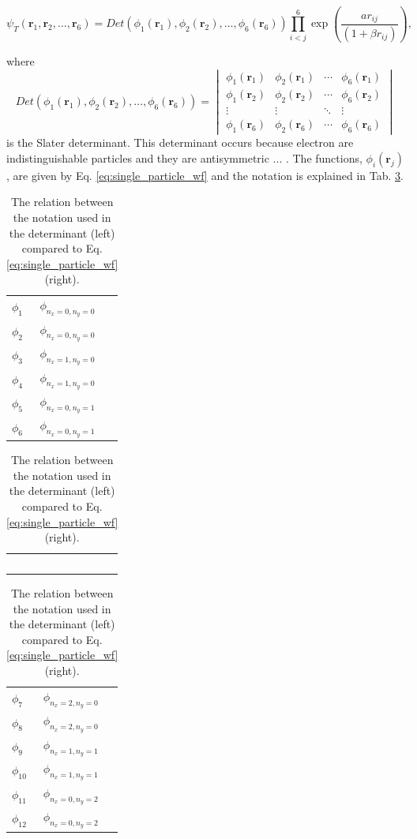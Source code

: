 \begin{equation}
   \psi_{T}(\bm{r}_1,\bm{r}_2,\dots, \bm{r}_6) = 
   Det\left(\phi_{1}(\bm{r}_1),\phi_{2}(\bm{r}_2),
   \dots,\phi_{6}(\bm{r}_6)\right)
   \prod_{i<j}^{6}\exp{\left(\frac{a r_{ij}}{(1+\beta r_{ij})}\right)},
\end{equation}

where 
$$ Det\left(\phi_{1}(\bm{r}_1),\phi_{2}(\bm{r}_2),
   \dots,\phi_{6}(\bm{r}_6)\right) =  \begin{vmatrix}
  \phi_{1}(\bm{r}_1) & \phi_{2}(\bm{r}_1) & \cdots & \phi_{6}(\bm{r}_1) \\
  \phi_{1}(\bm{r}_2) & \phi_{2}(\bm{r}_2) & \cdots & \phi_{6}(\bm{r}_2) \\
  \vdots  & \vdots  & \ddots & \vdots  \\
  \phi_{1}(\bm{r}_6) & \phi_{2}(\bm{r}_6) & \cdots & \phi_{6}(\bm{r}_6) 
\end{vmatrix}$$
is the Slater determinant. This determinant occurs because electron are indistinguishable particles and they are antisymmetric ... . The functions, $\phi_{i}(\bm{r}_j)$,  are given by Eq. \ref{eq:single_particle_wf} and the notation is explained in Tab. \ref{tab:notation_wavefunctions}. 

\begin{table}[H]\caption{The relation between the notation used in the determinant (left) compared to Eq. \ref{eq:single_particle_wf} (right). }\label{tab:notation_wavefunctions}
\large
\center
\begin{tabular}{l|l} 
$\phi_{1}$ & $\phi_{n_x=0, n_y=0}$\\
$\phi_{2}$ & $\phi_{n_x=0, n_y=0}$\\
$\phi_{3}$ & $\phi_{n_x=1, n_y=0}$\\
$\phi_{4}$ & $\phi_{n_x=1, n_y=0}$\\
$\phi_{5}$ & $\phi_{n_x=0, n_y=1}$\\
$\phi_{6}$ & $\phi_{n_x=0, n_y=1}$\\
\end{tabular}
\begin{tabular}{c}
$\,$
\end{tabular}
\begin{tabular}{l|l} 
$\phi_{7}$ & $\phi_{n_x=2, n_y=0}$\\
$\phi_{8}$ & $\phi_{n_x=2, n_y=0}$\\
$\phi_{9}$ & $\phi_{n_x=1, n_y=1}$\\
$\phi_{10}$ & $\phi_{n_x=1, n_y=1}$\\
$\phi_{11}$ & $\phi_{n_x=0, n_y=2}$\\
$\phi_{12}$ & $\phi_{n_x=0, n_y=2}$\\
\end{tabular}
\end{table}

